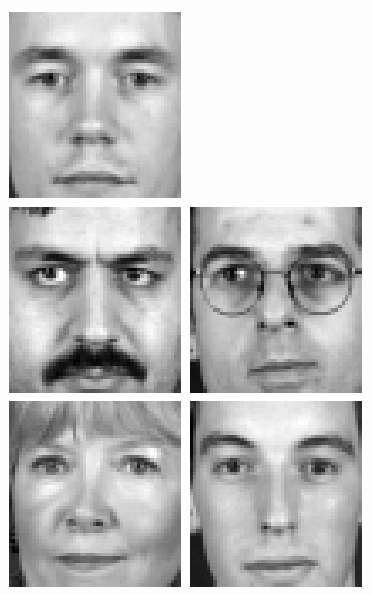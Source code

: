 \begin{figure}
\begin{center}
\includegraphics[scale=0.12]{ch4/figures/XM2VTS_16.png}\\
\includegraphics[scale=0.12]{ch4/figures/XM2VTS_17.png}
\includegraphics[scale=0.12]{ch4/figures/XM2VTS_18.png}
\includegraphics[scale=0.12]{ch4/figures/XM2VTS_19.png}
\includegraphics[scale=0.12]{ch4/figures/XM2VTS_20.png}

\end{center}
\end{figure}
